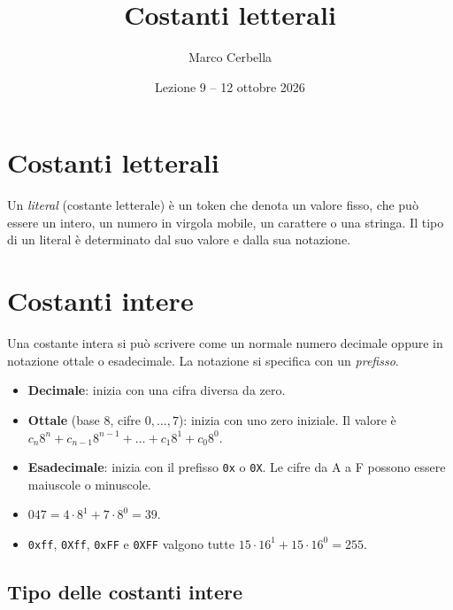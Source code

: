 \documentclass[11pt,a4paper]{article}
\title{Costanti letterali}
\author{Marco Cerbella}
\date{Lezione 9 -- 12 ottobre 2026}
\begin{document}
\maketitle

\section{Costanti letterali}

\begin{definizione}
Un \emph{literal} (costante letterale) è un token che denota un valore fisso, che può essere un intero, un numero in virgola mobile, un carattere o una stringa. Il tipo di un literal è determinato dal suo valore e dalla sua notazione.
\end{definizione}

\section{Costanti intere}

Una costante intera si può scrivere come un normale numero decimale oppure in notazione ottale o esadecimale. La notazione si specifica con un \emph{prefisso}.

\begin{itemize}
    \item \textbf{Decimale}: inizia con una cifra diversa da zero.
    \item \textbf{Ottale} (base 8, cifre $0, \dots, 7$): inizia con uno zero iniziale. Il valore è $c_n 8^n + c_{n-1} 8^{n-1} + \dots + c_1 8^1 + c_0 8^0$.
    \item \textbf{Esadecimale}: inizia con il prefisso \lstinline|0x| o \lstinline|0X|. Le cifre da A a F possono essere maiuscole o minuscole.
\end{itemize}

\begin{esempio}
\leavevmode
\begin{itemize}
    \item $047 = 4 \cdot 8^1 + 7 \cdot 8^0 = 39$.
    \item \lstinline|0xff|, \lstinline|0Xff|, \lstinline|0xFF| e \lstinline|0XFF| valgono tutte $15 \cdot 16^1 + 15 \cdot 16^0 = 255$.
\end{itemize}
\end{esempio}

\subsection{Tipo delle costanti intere}
\end{document}
